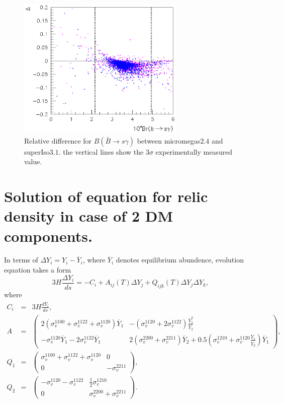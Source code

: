 \documentclass[12pt,a4paper]{article}
\begin{document}
\begin{figure}[htb]
\label{fig:iso}
\centering
\includegraphics[width=8cm]{bsgiso.eps}
\vspace{-.3cm}
\caption{ Relative difference for $B(\bar{B}\rightarrow s\gamma)$ between micromegas$2.4$ and superIso$3.1$.
the vertical lines show the $3\sigma$ experimentally measured value.
}
\end{figure}

\section{Solution of equation for relic density in case of 2 DM
components.}


In terms of  $\Delta Y_i = Y_i - \overline{Y}_i$,  where $\overline{Y}_i$
denotes equilibrium abundence,  evolution equation  takes a  form 
\begin{equation}
\label{MatrixZ4Eq}
        3H\frac{\Delta Y_i}{ds} = -C_i +A_{ij}(T)\Delta Y_j +Q_{ijk}(T) \Delta Y_j \Delta Y_k,
\end{equation}
where
\begin{eqnarray}
 C_i &=& 3H\frac{d \overline{Y}_i}{ds},\\
 A&=&\left( \begin{array}{cc}
2 (\sigma_v^{1100}+\sigma_v^{1122}+\sigma_v^{1120}) \overline{Y}_1 &-(\sigma_v^{1120}+2\sigma_v^{1122})\frac{\overline{Y}_1^2}{\overline{Y}_2}   \\
-\sigma_v^{1120} \overline{Y}_1 -2\sigma_v^{1122}\overline{Y}_1    &  2(\sigma_v^{2200}+\sigma_v^{2211})\overline{Y}_2
+ 0.5(\sigma_v^{1210} + \sigma_v^{1120}\frac{\overline{Y}_1}{\overline{Y}_2} )\overline{Y}_1
\end{array} \right), \\
 Q_1 &=& \left( \begin{array}{cc}
\sigma_v^{1100}+\sigma_v^{1122}+\sigma_v^{1120}  & 0 \\
0       & -\sigma_v^{2211}
\end{array} \right),\\
  Q_2&=&\left( \begin{array}{cc}
-\sigma_v^{1120} -\sigma_v^{1122} & \frac{1}{2}\sigma_v^{1210} \\
0 & \sigma_v^{2200}+\sigma_v^{2211} 
\end{array} \right). \\
\end{eqnarray}  
\end{document}
